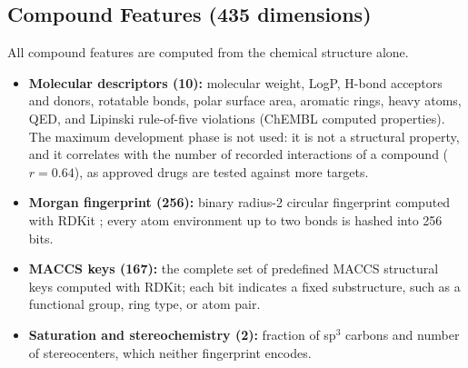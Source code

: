 \documentclass[11pt,letterpaper]{article}
\begin{document}
\subsection*{Compound Features (435 dimensions)}
All compound features are computed from the chemical structure alone.
\begin{itemize}
    \item \textbf{Molecular descriptors (10):} molecular weight, LogP, H-bond acceptors and donors, rotatable bonds, polar surface area, aromatic rings, heavy atoms, QED, and Lipinski rule-of-five violations (ChEMBL computed properties). The maximum development phase is not used: it is not a structural property, and it correlates with the number of recorded interactions of a compound ($r=0.64$), as approved drugs are tested against more targets.
    \item \textbf{Morgan fingerprint (256):} binary radius-2 circular fingerprint computed with RDKit \cite{rogers2010extended}; every atom environment up to two bonds is hashed into 256 bits.
    \item \textbf{MACCS keys (167):} the complete set of predefined MACCS structural keys \cite{durant2002reoptimization} computed with RDKit; each bit indicates a fixed substructure, such as a functional group, ring type, or atom pair.
    \item \textbf{Saturation and stereochemistry (2):} fraction of sp$^3$ carbons and number of stereocenters, which neither fingerprint encodes.
\end{itemize}
\end{document}
